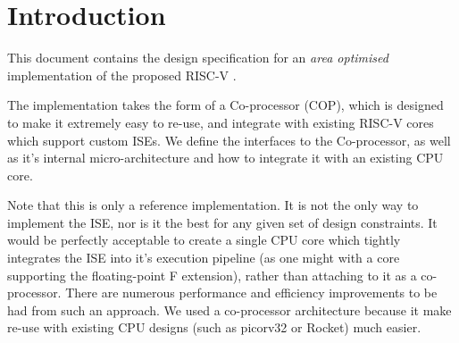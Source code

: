 \documentclass{scarv-report}
\begin{document}

\newcommandx{\ISE}{{\sf XCrypto}\xspace}

\newcommandx{\yosys}{{\tt yosys}\xspace}
\newcommandx{\Yosys}{Yosys\xspace}

\newcommand{\SIGNALS}[3]{
\begin{table}[H]
\begin{tabularx}{\textwidth}{@{} c c l Y @{}}
\toprule
\textbf{I/O} & \textbf{Size} & \textbf{Name} & \textbf{Description} \\
\midrule
#1
\bottomrule
\end{tabularx}
\caption{#2}
\label{#3}
\end{table}
}

\newcommand{\SIGREF}[1]{{\tt #1}}

\newcommand{\SIGNALI}[3]{
    {\bf I} & $#1$ &{\tt #2}& #3 \\ \addlinespace
}

\newcommand{\SIGNALO}[3]{
    {\bf O} & $#1$ &{\tt #2}& #3 \\ \addlinespace
}

\newcommand{\cpucopif}{\nameref{sec:cpu-cop-if} }


\section{Introduction}

This document contains the design specification for an {\em area optimised}
implementation of the proposed RISC-V \ISE.

The implementation takes the form of a Co-processor (COP), which is designed
to make it extremely easy to re-use, and integrate with existing RISC-V cores
which support custom ISEs. We define the interfaces to the Co-processor, as
well as it's internal micro-architecture and how to integrate it with an
existing CPU core.

Note that this is only a reference implementation. It is not the only way
to implement the ISE, nor is it the best for any given set of design
constraints. It would be perfectly acceptable to create a single CPU core
which tightly integrates the ISE into it's execution pipeline (as one might
with a core supporting the floating-point F extension), rather than
attaching to it as a co-processor. There are numerous performance and
efficiency improvements to be had from such an approach. We used a
co-processor architecture because it make re-use with existing CPU designs
(such as picorv32 or Rocket) much easier.
\end{document}
